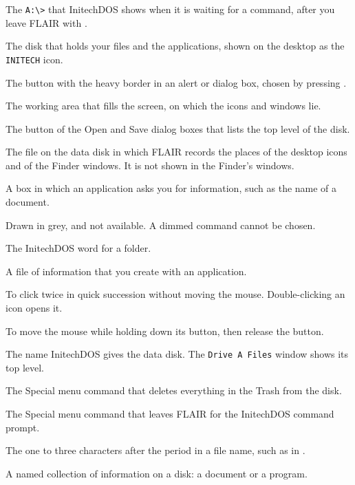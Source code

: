 The \texttt{A:\textbackslash>} that InitechDOS
shows when it is waiting for a command, after you leave FLAIR with
.

The disk that holds your files and the
applications, shown on the desktop as the \texttt{INITECH} icon.

The button with the heavy border in an alert
or dialog box, chosen by pressing .

The working area that fills the screen, on which the
icons and windows lie.

The button of the Open and Save dialog boxes
that lists the top level of the disk.

The file on the data disk in which FLAIR records
the places of the desktop icons and of the Finder windows.  It is not
shown in the Finder's windows.

A box in which an application asks you for
information, such as the name of a document.

Drawn in grey, and not available.  A dimmed command
cannot be chosen.

The InitechDOS word for a folder.

A file of information that you create with an
application.

To click twice in quick succession without
moving the mouse.  Double-clicking an icon opens it.

To move the mouse while holding down its button, then
release the button.

The name InitechDOS gives the data disk.  The
\texttt{Drive A Files} window shows its top level.

The Special menu command that deletes everything
in the Trash from the disk.

The Special menu command that leaves FLAIR
for the InitechDOS command prompt.

The one to three characters after the period in a
file name, such as  in .

A named collection of information on a disk: a
document or a program.

